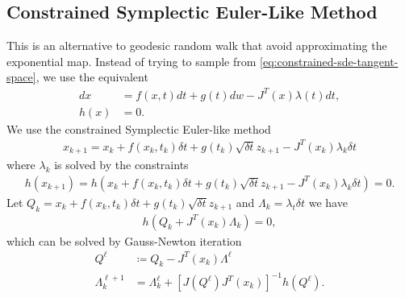 \documentclass[12pt]{report}
\begin{document}
\subsection{Constrained Symplectic Euler-Like Method}
This is an alternative to geodesic random walk that avoid approximating the exponential map. Instead of trying to sample from \eqref{eq:constrained-sde-tangent-space}, we use the equivalent
\begin{align*}
    dx&=f(x,t)dt+g(t)dw-J^T(x)\lambda(t)dt,\\
    h(x)&=0.
\end{align*}
We use the constrained Symplectic Euler-like method \cite{leimkuhlerMolecularDynamicsDeterministic2015}
\begin{align*}
    x_{k+1}=x_k+f(x_k,t_k)\delta t+g(t_k)\sqrt{\delta t}z_{k+1}-J^T(x_k)\lambda_k\delta t
\end{align*}
where \(\lambda_k\) is solved by the constraints
\begin{align*}
    h\left(x_{k+1}\right)=h\left(x_k+f(x_k,t_k)\delta t+g(t_k)\sqrt{\delta t}z_{k+1}-J^T(x_k)\lambda_k\delta t\right)=0.
\end{align*}
Let \(Q_k=x_k+f(x_k,t_k)\delta t+g(t_k)\sqrt{\delta t}z_{k+1}\) and \(\Lambda_k=\lambda_t\delta t\) we have
\begin{align*}
    h\left(Q_k+J^T(x_k)\Lambda_k\right)=0,
\end{align*}
which can be solved by Gauss-Newton iteration
\begin{align*}
    Q^{\ell}&\coloneq Q_k-J^T\left(x_k\right)\Lambda^{\ell}\\
    \Lambda_k^{\ell+1}&=\Lambda_k^{\ell}+\left[J\left(Q^{\ell}\right)J^T(x_k)\right]^{-1}h\left(Q^{\ell}\right).
\end{align*}



\end{document}
